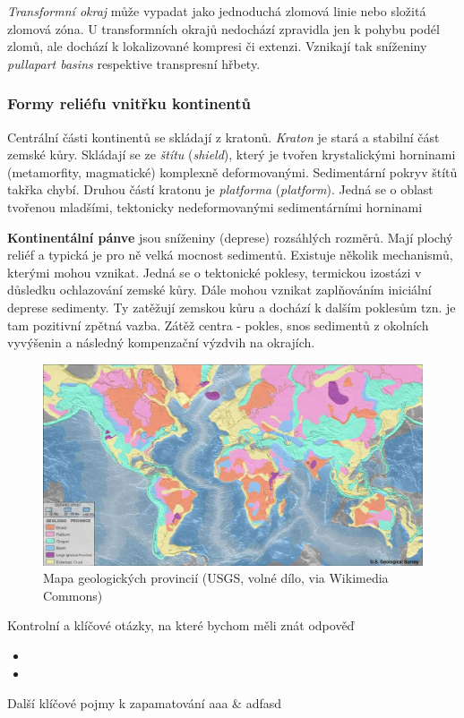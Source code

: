 \emph{Transformní okraj} může vypadat jako jednoduchá zlomová linie nebo složitá zlomová zóna. U transformních okrajů nedochází zpravidla jen k pohybu podél zlomů, ale dochází k lokalizované kompresi či extenzi. Vznikají tak sníženiny \textit{pullapart basins} respektive transpresní hřbety.

\subsubsection{Formy reliéfu vnitřku kontinentů}
Centrální části kontinentů se skládají z kratonů. \emph{Kraton} je stará a stabilní část zemské kůry. Skládají se ze \emph{štítu} (\textit{shield}), který je tvořen krystalickými horninami (metamorfity, magmatické) komplexně deformovanými. Sedimentární pokryv štítů takřka chybí. Druhou částí kratonu je \emph{platforma} (\textit{platform}). Jedná se o oblast tvořenou mladšími, tektonicky nedeformovanými sedimentárními horninami 

\textbf{Kontinentální pánve} jsou sníženiny (deprese) rozsáhlých rozměrů. Mají plochý reliéf a typická je pro ně velká mocnost sedimentů. Existuje několik mechanismů, kterými mohou vznikat. Jedná se o tektonické poklesy, termickou izostázi v důsledku ochlazování zemské kůry. Dále mohou vznikat zaplňováním iniciální deprese sedimenty. Ty zatěžují zemskou kůru a dochází k dalším poklesům tzn. je tam pozitivní zpětná vazba. Zátěž centra - pokles, snos sedimentů z okolních vyvýšenin a následný kompenzační výzdvih na okrajích.

\begin{figure}
	\centering
	\includegraphics[width=1\linewidth]{obrazky/tectonic/World_geologic_provinces}
	\caption{Mapa geologických provincií (USGS, volné dílo, via Wikimedia Commons)}
	\label{fig:worldgeologicprovinces}
\end{figure}

\newpage
\onecolumn
\begin{boxotazky}{Kontrolní a klíčové otázky, na které bychom měli znát odpověď}
	\begin{itemize}
		\item 
		\item 
		
	\end{itemize}
\end{boxotazky}

\begin{boxslovnik}{Další klíčové pojmy k zapamatování}
	aaa & adfasd \\
	
\end{boxslovnik}
\twocolumn